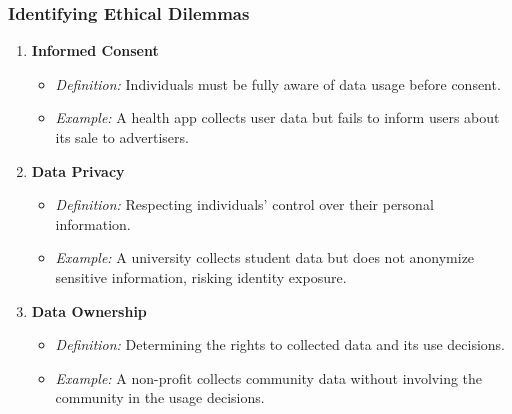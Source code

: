 \documentclass[aspectratio=169]{beamer}
\begin{document}
\begin{frame}[fragile]
    \frametitle{Identifying Ethical Dilemmas}
    \begin{enumerate}
        \item \textbf{Informed Consent}
            \begin{itemize}
                \item \textit{Definition:} Individuals must be fully aware of data usage before consent.
                \item \textit{Example:} A health app collects user data but fails to inform users about its sale to advertisers.
            \end{itemize}
        
        \item \textbf{Data Privacy}
            \begin{itemize}
                \item \textit{Definition:} Respecting individuals' control over their personal information.
                \item \textit{Example:} A university collects student data but does not anonymize sensitive information, risking identity exposure.
            \end{itemize}
        
        \item \textbf{Data Ownership}
            \begin{itemize}
                \item \textit{Definition:} Determining the rights to collected data and its use decisions.
                \item \textit{Example:} A non-profit collects community data without involving the community in the usage decisions.
            \end{itemize}
    \end{enumerate}
\end{frame}
\end{document}
